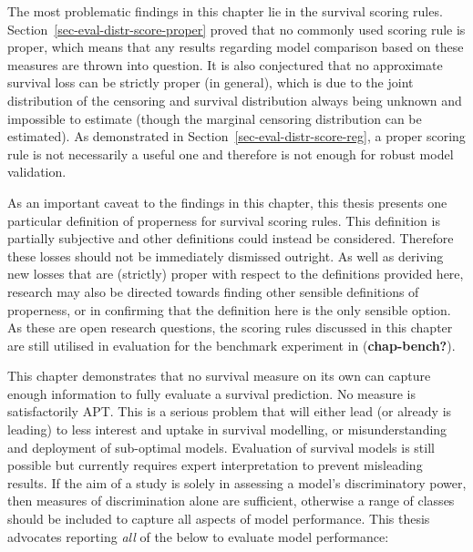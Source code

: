 \documentclass[
  letterpaper,
]{scrbook}
\theoremstyle{plain}
\theoremstyle{definition}
\theoremstyle{remark}
\begin{document}
The most problematic findings in this chapter lie in the survival
scoring rules. Section~\ref{sec-eval-distr-score-proper} proved that no
commonly used scoring rule is proper, which means that any results
regarding model comparison based on these measures are thrown into
question. It is also conjectured that no approximate survival loss can
be strictly proper (in general), which is due to the joint distribution
of the censoring and survival distribution always being unknown and
impossible to estimate (though the marginal censoring distribution can
be estimated). As demonstrated in
Section~\ref{sec-eval-distr-score-reg}, a proper scoring rule is not
necessarily a useful one and therefore is not enough for robust model
validation.

As an important caveat to the findings in this chapter, this thesis
presents one particular definition of properness for survival scoring
rules. This definition is partially subjective and other definitions
could instead be considered. Therefore these losses should not be
immediately dismissed outright. As well as deriving new losses that are
(strictly) proper with respect to the definitions provided here,
research may also be directed towards finding other sensible definitions
of properness, or in confirming that the definition here is the only
sensible option. As these are open research questions, the scoring rules
discussed in this chapter are still utilised in evaluation for the
benchmark experiment in (\textbf{chap-bench?}).

This chapter demonstrates that no survival measure on its own can
capture enough information to fully evaluate a survival prediction. No
measure is satisfactorily APT. This is a serious problem that will
either lead (or already is leading) to less interest and uptake in
survival modelling, or misunderstanding and deployment of sub-optimal
models. Evaluation of survival models is still possible but currently
requires expert interpretation to prevent misleading results. If the aim
of a study is solely in assessing a model's discriminatory power, then
measures of discrimination alone are sufficient, otherwise a range of
classes should be included to capture all aspects of model performance.
This thesis advocates reporting \emph{all} of the below to evaluate
model performance:
\end{document}
